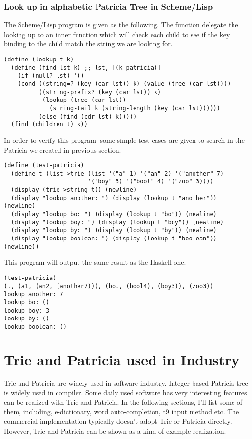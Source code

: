\documentclass{article}
\begin{document}
\subsubsection*{Look up in alphabetic Patricia Tree in Scheme/Lisp}

The Scheme/Lisp program is given as the following. The function
delegate the looking up to an inner function which will check each
child to see if the key binding to the child match the string we are
looking for.

\lstset{language=lisp}
\begin{lstlisting}
(define (lookup t k)
  (define (find lst k) ;; lst, [(k patricia)]
    (if (null? lst) '()
	(cond ((string=? (key (car lst)) k) (value (tree (car lst))))
	      ((string-prefix? (key (car lst)) k)
	       (lookup (tree (car lst))
		     (string-tail k (string-length (key (car lst))))))
	      (else (find (cdr lst) k)))))
  (find (children t) k))
\end{lstlisting}

In order to verify this program, some simple test cases are given to
search in the Patricia we created in previous section.

\begin{lstlisting}
(define (test-patricia)
  (define t (list->trie (list '("a" 1) '("an" 2) '("another" 7)
                        '("boy" 3) '("bool" 4) '("zoo" 3))))
  (display (trie->string t)) (newline)
  (display "lookup another: ") (display (lookup t "another")) (newline)
  (display "lookup bo: ") (display (lookup t "bo")) (newline)
  (display "lookup boy: ") (display (lookup t "boy")) (newline)
  (display "lookup by: ") (display (lookup t "by")) (newline)
  (display "lookup boolean: ") (display (lookup t "boolean")) (newline))
\end{lstlisting}

This program will output the same result as the Haskell one.

\begin{lstlisting}
(test-patricia)
(., (a1, (an2, (another7))), (bo., (bool4), (boy3)), (zoo3))
lookup another: 7
lookup bo: ()
lookup boy: 3
lookup by: ()
lookup boolean: ()
\end{lstlisting}

\section{Trie and Patricia used in Industry}
Trie and Patricia are widely used in software industry. Integer based
Patricia tree is widely used in compiler. Some daily
used software has very interesting features can be realized with
Trie and Patricia. In the following sections, I'll list some of them,
including, e-dictionary, word auto-completion, t9 input method etc.
The commercial implementation typically doesn't adopt Trie or Patricia
directly. However, Trie and Patricia can be shown as a kind of
example realization.
\end{document}
